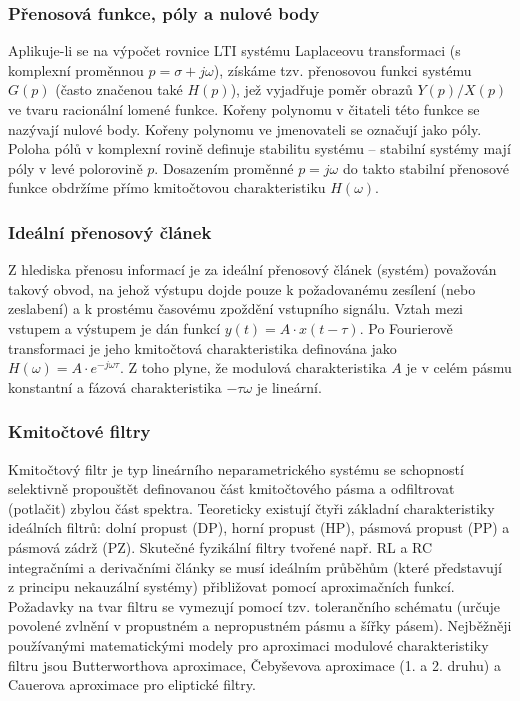     \subsubsection{Přenosová funkce, póly a nulové body} 
        Aplikuje-li se na výpočet rovnice LTI systému Laplaceovu transformaci (s komplexní proměnnou $p = \sigma + j\omega$), získáme tzv. přenosovou funkci systému $G(p)$ (často značenou také $H(p)$), jež vyjadřuje poměr obrazů $Y(p)/X(p)$ ve tvaru racionální lomené funkce. Kořeny polynomu v čitateli této funkce se nazývají nulové body. Kořeny polynomu ve jmenovateli se označují jako póly. Poloha pólů v komplexní rovině definuje stabilitu systému – stabilní systémy mají póly v levé polorovině $p$. Dosazením proměnné $p = j\omega$ do takto stabilní přenosové funkce obdržíme přímo kmitočtovou charakteristiku $H(\omega)$.
    \subsubsection{Ideální přenosový článek} 
        Z hlediska přenosu informací je za ideální přenosový článek (systém) považován takový obvod, na jehož výstupu dojde pouze k požadovanému zesílení (nebo zeslabení) a k prostému časovému zpoždění vstupního signálu. Vztah mezi vstupem a výstupem je dán funkcí $y(t) = A \cdot x(t - \tau)$. Po Fourierově transformaci je jeho kmitočtová charakteristika definována jako $H(\omega) = A \cdot e^{-j\omega\tau}$. Z toho plyne, že modulová charakteristika $A$ je v celém pásmu konstantní a fázová charakteristika $-\tau\omega$ je lineární.
    \subsubsection{Kmitočtové filtry} 
        Kmitočtový filtr je typ lineárního neparametrického systému se schopností selektivně propouštět definovanou část kmitočtového pásma a odfiltrovat (potlačit) zbylou část spektra. Teoreticky existují čtyři základní charakteristiky ideálních filtrů: dolní propust (DP), horní propust (HP), pásmová propust (PP) a pásmová zádrž (PZ). Skutečné fyzikální filtry tvořené např. RL a RC integračními a derivačními články se musí ideálním průběhům (které představují z principu nekauzální systémy) přibližovat pomocí aproximačních funkcí. Požadavky na tvar filtru se vymezují pomocí tzv. tolerančního schématu (určuje povolené zvlnění v propustném a nepropustném pásmu a šířky pásem). Nejběžněji používanými matematickými modely pro aproximaci modulové charakteristiky filtru jsou Butterworthova aproximace, Čebyševova aproximace (1. a 2. druhu) a Cauerova aproximace pro eliptické filtry.
